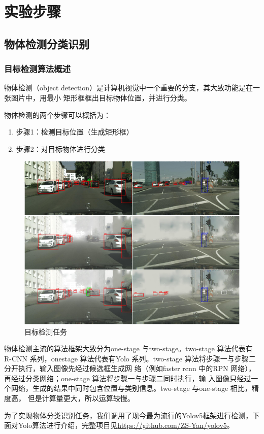 \section{实验步骤}
\subsection{物体检测分类识别}
\subsubsection{目标检测算法概述}
物体检测（object detection）是计算机视觉中一个重要的分支，其大致功能是在一张图片中，用最小
矩形框框出目标物体位置，并进行分类。

物体检测的两个步骤可以概括为：
\begin{enumerate}
	\item 步骤1：检测目标位置（生成矩形框）
	\item 步骤2：对目标物体进行分类
\end{enumerate}
\begin{figure}
	\centering
	\includegraphics[width=0.7\linewidth]{screenshot010}
	\caption{目标检测任务}
	\label{fig:screenshot010}
\end{figure}

物体检测主流的算法框架大致分为one-stage 与two-stage。two-stage 算法代表有R-CNN 系列，onestage
算法代表有Yolo 系列。two-stage 算法将步骤一与步骤二分开执行，输入图像先经过候选框生成网
络（例如faster rcnn 中的RPN 网络），再经过分类网络；one-stage 算法将步骤一与步骤二同时执行，输
入图像只经过一个网络，生成的结果中同时包含位置与类别信息。two-stage 与one-stage 相比，精度高，
但是计算量更大，所以运算较慢。

为了实现物体分类识别任务，我们调用了现今最为流行的Yolov5框架进行检测，下面对Yolo算法进行介绍，完整项目见\href{https://github.com/ZS-Yan/yolov5}{https://github.com/ZS-Yan/yolov5}。
